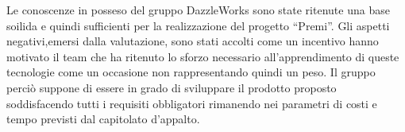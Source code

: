 Le conoscenze in posseso del gruppo DazzleWorks sono state ritenute una base soilida e quindi sufficienti per la realizzazione del progetto “Premi”.
Gli aspetti negativi,emersi dalla valutazione, sono stati accolti come un incentivo hanno motivato il team che ha ritenuto lo sforzo necessario all’apprendimento di queste tecnologie come un occasione non rappresentando quindi un peso.
Il gruppo perciò suppone di essere in grado di sviluppare il prodotto proposto soddisfacendo tutti i requisiti obbligatori rimanendo nei parametri di costi e tempo previsti dal capitolato d’appalto.
